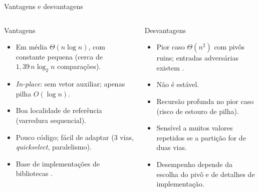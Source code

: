 \documentclass[aspectratio=169,10pt]{beamer}
\begin{document}
\begin{frame}{Vantagens e desvantagens}
 \begin{columns}[T]
   \begin{block}{Vantagens}
    \footnotesize
    \begin{itemize}
     \item Em média $\Theta(n\log n)$, com constante pequena (cerca de $1{,}39\,n\log_2 n$ comparações).
     \item \emph{In-place}: sem vetor auxiliar; apenas pilha $O(\log n)$.
     \item Boa localidade de referência (varredura sequencial).
     \item Pouco código; fácil de adaptar (3 vias, \emph{quickselect}, paralelismo).
     \item Base de implementações de bibliotecas \cite{bentleymcilroy93,musser97}.
    \end{itemize}
   \end{block}
   \begin{alertblock}{Desvantagens}
    \footnotesize
    \begin{itemize}
     \item Pior caso $\Theta(n^2)$ com pivôs ruins; entradas adversárias existem \cite{mcilroy99}.
     \item Não é estável.
     \item Recursão profunda no pior caso (risco de estouro de pilha).
     \item Sensível a muitos valores repetidos se a partição for de duas vias.
     \item Desempenho depende da escolha do pivô e de detalhes de implementação.
    \end{itemize}
   \end{alertblock}
 \end{columns}
\end{frame}
\end{document}
